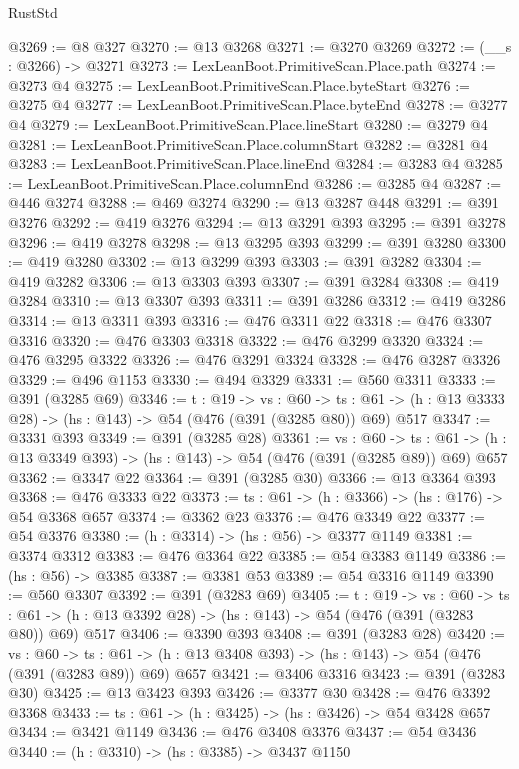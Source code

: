 \begin{lexlean}{RustStd}
\begin{coremodule}
@3269 := @8 @327
@3270 := @13 @3268
@3271 := @3270 @3269
@3272 := (__s : @3266) -> @3271
@3273 := LexLeanBoot.PrimitiveScan.Place.path
@3274 := @3273 @4
@3275 := LexLeanBoot.PrimitiveScan.Place.byteStart
@3276 := @3275 @4
@3277 := LexLeanBoot.PrimitiveScan.Place.byteEnd
@3278 := @3277 @4
@3279 := LexLeanBoot.PrimitiveScan.Place.lineStart
@3280 := @3279 @4
@3281 := LexLeanBoot.PrimitiveScan.Place.columnStart
@3282 := @3281 @4
@3283 := LexLeanBoot.PrimitiveScan.Place.lineEnd
@3284 := @3283 @4
@3285 := LexLeanBoot.PrimitiveScan.Place.columnEnd
@3286 := @3285 @4
@3287 := @446 @3274
@3288 := @469 @3274
@3290 := @13 @3287 @448
@3291 := @391 @3276
@3292 := @419 @3276
@3294 := @13 @3291 @393
@3295 := @391 @3278
@3296 := @419 @3278
@3298 := @13 @3295 @393
@3299 := @391 @3280
@3300 := @419 @3280
@3302 := @13 @3299 @393
@3303 := @391 @3282
@3304 := @419 @3282
@3306 := @13 @3303 @393
@3307 := @391 @3284
@3308 := @419 @3284
@3310 := @13 @3307 @393
@3311 := @391 @3286
@3312 := @419 @3286
@3314 := @13 @3311 @393
@3316 := @476 @3311 @22
@3318 := @476 @3307 @3316
@3320 := @476 @3303 @3318
@3322 := @476 @3299 @3320
@3324 := @476 @3295 @3322
@3326 := @476 @3291 @3324
@3328 := @476 @3287 @3326
@3329 := @496 @1153
@3330 := @494 @3329
@3331 := @560 @3311
@3333 := @391 (@3285 @69)
@3346 := {t : @19} ->
  {vs : @60} ->
  {ts : @61} -> (h : @13 @3333 @28) -> (hs : @143) -> @54 (@476 (@391 (@3285 @80)) @69) @517
@3347 := @3331 @393
@3349 := @391 (@3285 @28)
@3361 := {vs : @60} ->
  {ts : @61} -> (h : @13 @3349 @393) -> (hs : @143) -> @54 (@476 (@391 (@3285 @89)) @69) @657
@3362 := @3347 @22
@3364 := @391 (@3285 @30)
@3366 := @13 @3364 @393
@3368 := @476 @3333 @22
@3373 := {ts : @61} -> (h : @3366) -> (hs : @176) -> @54 @3368 @657
@3374 := @3362 @23
@3376 := @476 @3349 @22
@3377 := @54 @3376
@3380 := (h : @3314) -> (hs : @56) -> @3377 @1149
@3381 := @3374 @3312
@3383 := @476 @3364 @22
@3385 := @54 @3383 @1149
@3386 := (hs : @56) -> @3385
@3387 := @3381 @53
@3389 := @54 @3316 @1149
@3390 := @560 @3307
@3392 := @391 (@3283 @69)
@3405 := {t : @19} ->
  {vs : @60} ->
  {ts : @61} -> (h : @13 @3392 @28) -> (hs : @143) -> @54 (@476 (@391 (@3283 @80)) @69) @517
@3406 := @3390 @393
@3408 := @391 (@3283 @28)
@3420 := {vs : @60} ->
  {ts : @61} -> (h : @13 @3408 @393) -> (hs : @143) -> @54 (@476 (@391 (@3283 @89)) @69) @657
@3421 := @3406 @3316
@3423 := @391 (@3283 @30)
@3425 := @13 @3423 @393
@3426 := @3377 @30
@3428 := @476 @3392 @3368
@3433 := {ts : @61} -> (h : @3425) -> (hs : @3426) -> @54 @3428 @657
@3434 := @3421 @1149
@3436 := @476 @3408 @3376
@3437 := @54 @3436
@3440 := (h : @3310) -> (hs : @3385) -> @3437 @1150

\end{coremodule}
\end{lexlean}
